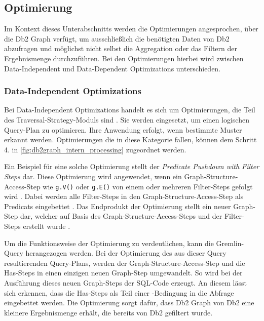 \subsection{Optimierung}
\label{db2graph:optimierung}

Im Kontext dieses Unterabschnitts werden die Optimierungen angesprochen, über die Db2 Graph verfügt, um ausschließlich die benötigten Daten von Db2 abzufragen und möglichst nicht selbst die Aggregation oder das Filtern der Ergebnismenge durchzuführen. Bei den Optimierungen hierbei wird zwischen Data-Independent und Data-Dependent Optimizations unterschieden. 

\subsubsection{Data-Independent Optimizations}
Bei Data-Independent Optimizations handelt es sich um Optimierungen, die Teil des Traversal-Strategy-Moduls sind \cite{sigmod_tian}. Sie werden eingesetzt, um einen logischen Query-Plan zu optimieren. Ihre Anwendung erfolgt, wenn bestimmte Muster erkannt werden. Optimierungen die in diese Kategorie fallen, können dem Schritt 4. in \autoref{fig:db2graph_intern_processing} zugeordnet werden. 

Ein Beispiel für eine solche Optimierung stellt der \textit{Predicate Pushdown with Filter Steps} dar. Diese Optimierung wird angewendet, wenn ein Graph-Structure-Access-Step wie \texttt{g.V()} oder \texttt{g.E()} von einem oder mehreren Filter-Steps gefolgt wird \cite{sigmod_tian}. Dabei werden alle Filter-Steps in den Graph-Structure-Access-Step als Predicats eingebettet \cite{sigmod_tian}. Das Endprodukt der Optimierung stellt ein neuer Graph-Step dar, welcher auf Basis des Graph-Structure-Access-Steps und der Filter-Steps erstellt wurde \cite{sigmod_tian}. 
    
Um die Funktionsweise der Optimierung zu verdeutlichen, kann die Gremlin-Query  herangezogen werden. Bei der Optimierung des aus dieser Query resultierenden Query-Plans, werden der Graph-Structure-Access-Step und die Has-Steps in einen einzigen neuen Graph-Step umgewandelt. So wird bei der Ausführung dieses neuen Graph-Steps der SQL-Code  erzeugt. An diesem lässt sich erkennen, dass die Has-Steps als Teil einer -Bedingung in die Abfrage eingebettet werden. Die Optimierung sorgt dafür, dass Db2 Graph von Db2 eine kleinere Ergebnismenge erhält, die bereits von Db2 gefiltert wurde.

